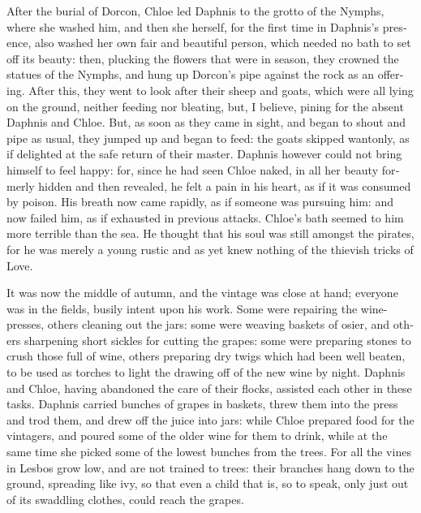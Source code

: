 \documentclass{book}
\begin{document}
\begin{pairs}
\begin{Rightside}
\begin{english}
  After the burial of Dorcon, Chloe led Daphnis to the grotto of the Nymphs, where she washed him, and then she herself, for the first time in Daphnis's presence, also washed her own fair and beautiful person, which needed no bath to set off its beauty: then, plucking the flowers that were in season, they crowned the statues of the Nymphs, and hung up Dorcon's pipe against the rock as an offering.  After this, they went to look after their sheep and goats, which were all lying on the ground, neither feeding nor bleating, but, I believe, pining for the absent Daphnis and Chloe.  But, as soon as they came in sight, and began to shout and pipe as usual, they jumped up and began to feed: the goats skipped wantonly, as if delighted at the safe return of their master.  Daphnis however could not bring himself to feel happy: for, since he had seen Chloe naked, in all her beauty formerly hidden and then revealed, he felt a pain in his heart, as if it was consumed by poison.  His breath now came rapidly, as if someone was pursuing him: and now failed him, as if exhausted in previous attacks.  Chloe's bath seemed to him more terrible than the sea.  He thought that his soul was still amongst the pirates, for he was merely a young rustic and as yet knew nothing of the thievish tricks of Love.
\pend


  It was now the middle of autumn, and the vintage was close at hand; everyone was in the fields, busily intent upon his work.  Some were repairing the wine-presses, others cleaning out the jars: some were weaving baskets of osier, and others sharpening short sickles for cutting the grapes: some were preparing stones to crush those full of wine, others preparing dry twigs which had been well beaten, to be used as torches to light the drawing off of the new wine by night.  Daphnis and Chloe, having abandoned the care of their flocks, assisted each other in these tasks.  Daphnis carried bunches of grapes in baskets, threw them into the press and trod them, and drew off the juice into jars: while Chloe prepared food for the vintagers, and poured some of the older wine for them to drink, while at the same time she picked some of the lowest bunches from the trees.  For all the vines in Lesbos grow low, and are not trained to trees: their branches hang down to the ground, spreading like ivy, so that even a child that is, so to speak, only just out of its swaddling clothes, could reach the grapes.
\pend



\end{english}
\end{Rightside}
\end{pairs}
\end{document}
